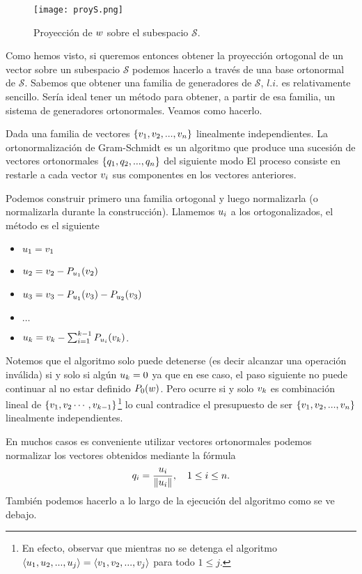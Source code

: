 \begin{figure}
\texttt{[image: proyS.png]}
 \label{fig:proyecsobreS}
 \caption{Proyección de $\wb$ sobre el subespacio $\mathcal{S}$.}
\end{figure}
Como hemos visto, si queremos entonces obtener la proyección ortogonal de un vector sobre un subespacio $\mathcal{S}$ podemos hacerlo a través de una base ortonormal de $\mathcal{S}$. Sabemos que obtener una familia de generadores de $\mathcal{S}$, $l.i.$ es relativamente sencillo. Sería ideal tener un método para obtener, a partir de esa familia, un sistema de generadores ortonormales. Veamos como hacerlo.

Dada una familia de vectores $\{\vb_1, \vb_2, ...,\vb_n\}$ linealmente independientes. La ortonormalización de Gram-Schmidt
es un algoritmo que produce una sucesión de vectores ortonormales  $\{\qb_1,\qb_2,...,\qb_n\}$ del siguiente modo
El proceso consiste en restarle a cada vector $\vb_i$ sus componentes en los vectores anteriores.

Podemos construir primero una familia ortogonal y luego normalizarla (o normalizarla durante la construcción). Llamemos $\ub_i$ a los ortogonalizados, el método es el siguiente
\begin{itemize}
\item   $\ub_1 = \vb_1$
\item   $\ub_2 = \vb_2 -\Pb_{\ub_1}(\vb_2)$
\item   $\ub_3 = \vb_3 -
\Pb_{\ub_1}(\vb_3)-\Pb_{\ub_2}(\vb_3)$
\item   $\dots$
\item $\ub_k = \vb_k - \sum_{i = 1}^{k-1} \Pb_{\ub_i}(\vb_k)$.
\end{itemize}
Notemos que el algoritmo solo puede detenerse (es decir alcanzar una operación inválida) si y solo si algún $u_k=\cero$ ya que en ese caso, el paso siguiente no puede continuar al no estar definido $\Pb_{\cero}(\wb)$. Pero ocurre si y solo $\vb_k$ es combinación lineal de $\{\vb_1,\vb_2\cdots,\vb_{k-1}\}$\footnote{En efecto, observar que mientras no se detenga el algoritmo $\langle\ub_1,\ub_2,...,\ub_{j}\rangle=\langle\vb_1,\vb_2,..., \vb_{j}\rangle$ para todo $1\le j$.} lo cual contradice el presupuesto de ser $\{\vb_1, \vb_2, ...,\vb_n\}$ linealmente independientes.

En muchos casos  es conveniente utilizar vectores ortonormales  podemos normalizar los vectores obtenidos mediante la fórmula
$$\qb_i = \frac{\ub_i}{\|\ub_i\|}, \quad 1 \le i \le n.$$
También podemos hacerlo a lo largo de la ejecución del algoritmo como se ve debajo.


